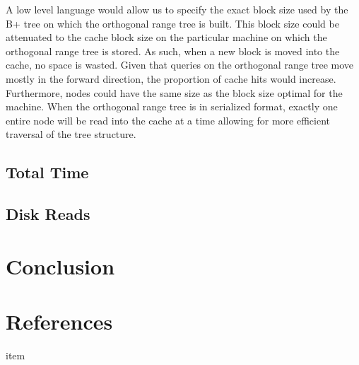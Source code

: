 \documentclass[11pt, oneside]{article}
\begin{document}
A low level language would allow us to specify the exact block size used by the B+ tree on which the orthogonal range tree is built. This block size could be attenuated to the cache block size on the particular machine on which the orthogonal range tree is stored. As such, when a new block is moved into the cache, no space is wasted. Given that queries on the orthogonal range tree move mostly in the forward direction, the proportion of cache hits would increase. Furthermore, nodes could have the same size as the block size optimal for the machine. When the orthogonal range tree is in serialized format, exactly one entire node will be read into the cache at a time allowing for more efficient traversal of the tree structure.


\subsection{Total Time}

\subsection{Disk Reads}

\section{Conclusion}


\section{References}

\noindent

\begin{description}

\item item

\end{description}
\end{document}
